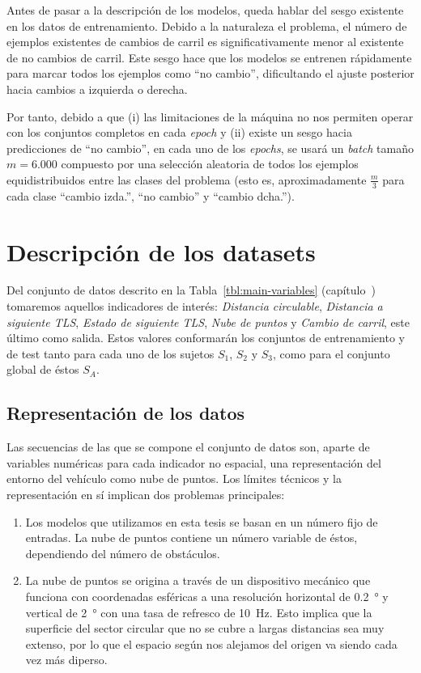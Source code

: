 Antes de pasar a la descripción de los modelos, queda hablar del sesgo existente en los datos de entrenamiento. Debido a la naturaleza el problema, el número de ejemplos existentes de cambios de carril es significativamente menor al existente de no cambios de carril. Este sesgo hace que los modelos se entrenen rápidamente para marcar todos los ejemplos como \enquote{no cambio}, dificultando el ajuste posterior hacia cambios a izquierda o derecha.

Por tanto, debido a que (i) las limitaciones de la máquina no nos permiten operar con los conjuntos completos en cada \textit{epoch} y (ii) existe un sesgo hacia predicciones de \enquote{no cambio}, en cada uno de los \textit{epochs}, se usará un \textit{batch} tamaño $m = 6.000$ compuesto por una selección aleatoria de todos los ejemplos equidistribuidos entre las clases del problema (esto es, aproximadamente $\frac{m}{3}$ para cada clase \enquote{cambio izda.}, \enquote{no cambio} y \enquote{cambio dcha.}).

\section{Descripción de los datasets}

Del conjunto de datos descrito en la Tabla~\ref{tbl:main-variables} (capítulo~) tomaremos aquellos indicadores de interés: \textit{Distancia circulable}, \textit{Distancia a siguiente TLS}, \textit{Estado de siguiente TLS}, \textit{Nube de puntos} y \textit{Cambio de carril}, este último como salida. Estos valores conformarán los conjuntos de entrenamiento y de test tanto para cada uno de los sujetos $S_1$, $S_2$ y $S_3$, como para el conjunto global de éstos $S_A$.

\subsection{Representación de los datos}

Las secuencias de las que se compone el conjunto de datos son, aparte de variables numéricas para cada indicador no espacial, una representación del entorno del vehículo como nube de puntos. Los límites técnicos y la representación en sí implican dos problemas principales:

\begin{enumerate}
	\item Los modelos que utilizamos en esta tesis se basan en un número fijo de entradas. La nube de puntos contiene un número variable de éstos, dependiendo del número de obstáculos.
	\item La nube de puntos se origina a través de un dispositivo mecánico que funciona con coordenadas esféricas a una resolución horizontal de \SI{0.2}{\degree} y vertical de \SI{2}{\degree} con una tasa de refresco de \SI{10}{\hertz}. Esto implica que la superficie del sector circular que no se cubre a largas distancias sea muy extenso, por lo que el espacio según nos alejamos del origen va siendo cada vez más diperso.
\end{enumerate}


